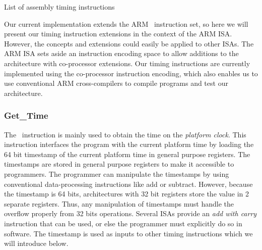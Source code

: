 \begin{table}
\noindent{}
\caption{List of assembly timing instructions}
\label{table:timing_instructions}
\end{table}

Our current implementation extends the ARM~ instruction set, so here we will present our timing instruction extensions in the context of the ARM ISA.
However, the concepts and extensions could easily be applied to other ISAs. 
The ARM ISA sets aside an instruction encoding space to allow additions to the architecture with co-processor extensions. 
Our timing instructions are currently implemented using the co-processor instruction encoding, which also enables us to use conventional ARM cross-compilers to compile programs and test our architecture.     

\subsubsection{Get\_Time}
The \gettime\ instruction is mainly used to obtain the time on the \emph{platform clock}.
This instruction interfaces the program with the current platform time by loading the 64 bit timestamp of the current platform time in general purpose registers. 
The timestamps are stored in general purpose registers to make it accessible to programmers. 
The programmer can manipulate the timestamps by using conventional data-processing instructions like add or subtract.
However, because the timestamp is 64 bits, architectures with 32 bit registers store the value in 2 separate registers. 
Thus, any manipulation of timestamps must handle the overflow  properly from 32 bits operations. 
Several ISAs provide an \emph{add with carry} instruction that can be used, or else the programmer must explicitly do so in software.
The timestamp is used as inputs to other timing instructions which we will introduce below.   

